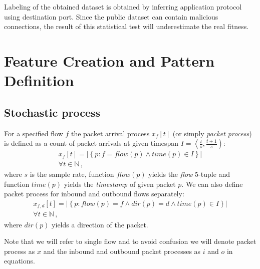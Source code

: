 Labeling of the obtained dataset is obtained by inferring application 
protocol using destination port.
Since the public dataset can contain malicious connections, 
the result of this statistical test will underestimate the real fitness.

\section{Feature Creation and Pattern Definition}

\subsection{Stochastic process}

For a specified flow $f$ the packet arrival process $x_f\left[t\right]$ 
(or simply \emph{packet process})  is defined as a count of packet arrivals 
at given timespan $I = \left\langle \frac{t}{s}, \frac{t+1}{s} \right)$:
\begin{equation}\label{packetprocess}
\begin{split}
	 x_f\left[t\right] = \left| 
	\left\lbrace p : f = flow(p) \wedge time(p) \in I \right\rbrace \right|\\
	\forall t \in \mathbb{N}\, ,
\end{split}
\end{equation}
where $s$ is the sample rate, function $flow(p)$  yields the \emph{flow} 5-tuple 
and function $time(p)$  yields the \emph{timestamp} of given packet $p$. 
We can also define packet process for inbound and outbound flows separately:
\begin{equation}\label{xpacketprocess}
\begin{split}
  x_{f,d}\left[t\right] = \left| 
  \left\lbrace p : flow(p) = f \wedge dir(p) = d \wedge time(p) \in I  \right\rbrace \right|\\
  \forall t \in \mathbb{N}\, ,
\end{split}
\end{equation}%
where $dir(p)$ yields a direction of the packet. 

Note that we will refer to single flow and to avoid confusion
we will denote packet process as $x$ and the inbound and
outbound packet processes as $i$ and $o$  in equations. 


